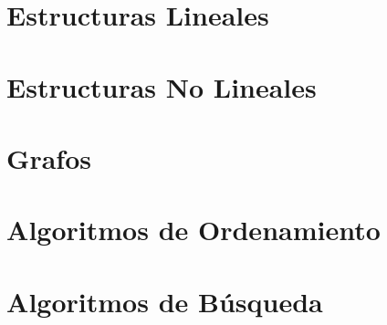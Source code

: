 \documentclass[12pt, a4paper, openany]{book}
\begin{document}
\part{~Estructuras Lineales}







\part{~Estructuras No Lineales}















\part{~Grafos}














\part{~Algoritmos de Ordenamiento}






\part{~Algoritmos de Búsqueda}


\end{document}
